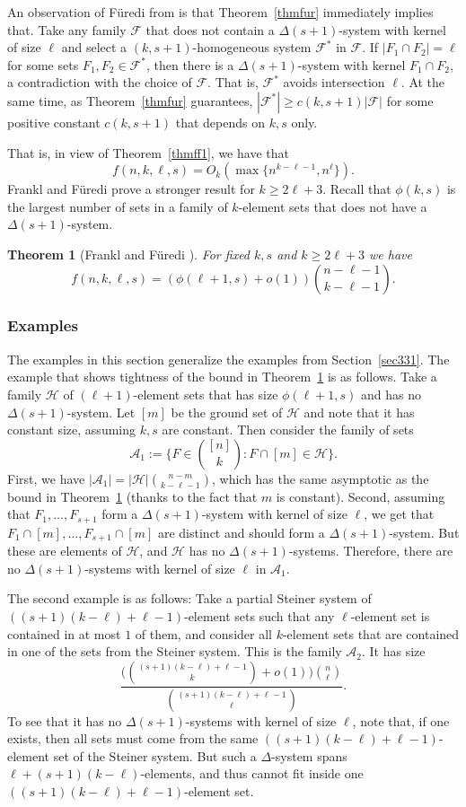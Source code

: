 \documentclass[graybox]{svmult}
\renewcommand{\ge}{\geqslant}
\newcommand{\ff}{\mathcal{F}}
\newcommand{\m}{\mathcal}
\newtheorem{thm}{Theorem}
\begin{document}
An observation of F\"uredi from \cite{Fu1} is that Theorem~\ref{thmfur} immediately implies that.  Take any family $\ff$ that does not contain a $\Delta(s+1)$-system with kernel of size $\ell$ and select a $(k,s+1)$-homogeneous system $\ff^*$ in $\ff$. If $|F_1\cap F_2|=\ell$ for some sets $F_1,F_2\in \ff^*$, then there is a $\Delta(s+1)$-system with kernel $F_1\cap F_2$, a contradiction with the choice of $\ff$. That is, $\ff^*$ avoids intersection $\ell$. At the same time, as Theorem~\ref{thmfur} guarantees, $|\ff^*|\ge c(k,s+1) |\ff|$ for some positive constant $c(k,s+1)$ that depends on $k,s$ only.

That is, in view of Theorem~\ref{thmff1}, we have that $$f(n,k,\ell,s) = O_k(\max\{n^{k-\ell-1}, n^{\ell}\}).$$ Frankl and F\"uredi prove a stronger result for $k\ge 2\ell+3$. Recall that $\phi(k,s)$ is the largest number of sets in a family of $k$-element sets that does not have a $\Delta(s+1)$-system.
\begin{thm}[Frankl and F\"uredi \cite{FF2}]\label{thmff3}
For fixed $k,s$ and $k\ge 2\ell+3$ we have
$$f(n,k,\ell,s) = (\phi(\ell+1,s)+o(1)){n-\ell-1\choose k-\ell-1}.$$
\end{thm}
\subsubsection{Examples}\label{sec411} The examples in this section generalize the examples from Section~\ref{sec331}. The example that shows tightness of the bound in Theorem~\ref{thmff3} is as follows. Take a family $\m H$ of $(\ell+1)$-element sets that has size $\phi(\ell+1,s)$ and has no $\Delta(s+1)$-system. Let $[m]$ be the ground set of $\m H$ and note that it has constant size, assuming $k,s$ are constant. Then consider the family of sets
$$\mathcal A_1:=\Big\{F\in {[n]\choose k}: F\cap [m]\in \m H\Big\}.$$
First, we have $|\mathcal A_1| = |\m H|{n-m\choose k-\ell-1}$, which has the same asymptotic as the bound in Theorem~\ref{thmff3} (thanks to the fact that $m$ is constant). Second, assuming that $F_1,\ldots, F_{s+1}$ form a $\Delta(s+1)$-system with kernel of size $\ell$, we get that $F_1\cap [m],\ldots, F_{s+1}\cap [m]$ are distinct and should form a $\Delta(s+1)$-system. But these are elements of $\m H$, and $\m H$ has no $\Delta(s+1)$-systems. Therefore, there are no $\Delta(s+1)$-systems with kernel of size $\ell$ in $\m A_1$.

The second example is as follows: Take a partial Steiner system of $((s+1)(k-\ell)+\ell-1)$-element sets such that any $\ell$-element set is contained in at most $1$ of them, and consider all $k$-element sets that are contained in one of the sets from the Steiner system. This is the family $\m A_2$. It has size
$$\frac{\Big({(s+1)(k-\ell)+\ell-1\choose k}+o(1)\Big){n\choose \ell}}{{(s+1)(k-\ell)+\ell-1\choose \ell}}.$$
To see that it has no $\Delta(s+1)$-systems with kernel of size $\ell$, note that, if one exists, then all sets must come from the same $((s+1)(k-\ell)+\ell-1)$-element set of the Steiner system. But such a $\Delta$-system spans $\ell+(s+1)(k-\ell)$-elements, and thus cannot fit inside one $((s+1)(k-\ell)+\ell-1)$-element set.
\end{document}
